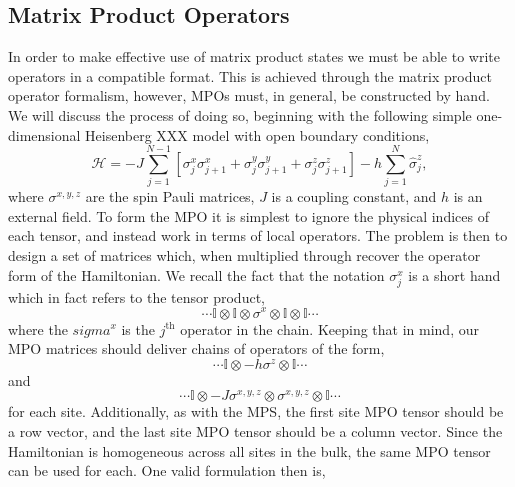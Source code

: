  \subsection{Matrix Product Operators}
 In order to make effective use of matrix product states we must be able to write operators in a compatible format. This is achieved through the matrix product operator formalism, however, MPOs must, in general, be constructed by hand. We will discuss the process of doing so, beginning with the following simple one-dimensional Heisenberg XXX model with open boundary conditions,
 \begin{equation}
 	\mathcal {H} = -J \sum_{j=1}^{N-1} \left[ \sigma^{x}_{j}\sigma^{x}_{j+1} + \sigma^{y}_{j}\sigma^{y}_{j+1} + \sigma^{z}_{j}\sigma^{z}_{j+1} \right] - h \sum_{j=1}^{N} \hat{\sigma}^{z}_{j},  
 	\label{eq:mpo1-1}
 \end{equation}
 where \(\sigma^{x,y,z}\) are the spin Pauli matrices, \(J\) is a coupling constant, and \(h\) is an external field. To form the MPO it is simplest to ignore the physical indices of each tensor, and instead work in terms of local operators. The problem is then to design a set of matrices which, when multiplied through recover the operator form of the Hamiltonian. We recall the fact that the notation \(\sigma^{x}_{j}\) is a short hand which in fact refers to the tensor product,
 \begin{equation*}
 	\cdots \mathbb{I} \otimes \mathbb{I} \otimes \sigma^{x} \otimes \mathbb{I} \otimes \mathbb{I} \cdots
 \end{equation*}
 where the \(sigma^{x}\) is the \(j^{\mathrm{th}}\) operator in the chain. Keeping that in mind, our MPO matrices should deliver chains of operators of the form,
 \begin{equation*}
 	\cdots \mathbb{I} \otimes -h\sigma^{z} \otimes \mathbb{I} \cdots
 \end{equation*}
 and
 \begin{equation*}
 	\cdots \mathbb{I} \otimes -J\sigma^{x,y,z} \otimes \sigma^{x,y,z} \otimes \mathbb{I} \cdots
 \end{equation*}
 for each site. Additionally, as with the MPS, the first site MPO tensor should be a row vector, and the last site MPO tensor should be a column vector. Since the Hamiltonian is homogeneous across all sites in the bulk, the same MPO tensor can be used for each. One valid formulation then is,
